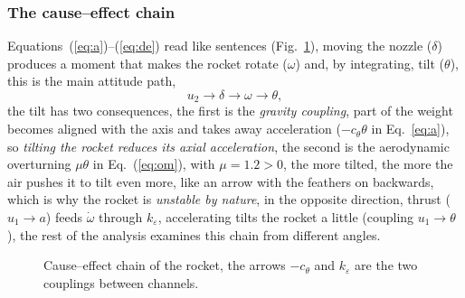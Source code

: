 \documentclass[article, 11pt]{IEEEtran}   %
\begin{document}
\subsubsection{The cause--effect chain}
Equations~(\ref{eq:a})--(\ref{eq:de}) read like sentences (Fig.~\ref{fig:cadena}), moving the nozzle ($\delta$) produces a moment that makes the rocket rotate ($\omega$) and, by integrating, tilt ($\theta$), this is the main attitude path,
\begin{equation}
u_2\to\delta\to\omega\to\theta,
\end{equation}
the tilt has two consequences, the first is the \emph{gravity coupling}, part of the weight becomes aligned with the axis and takes away acceleration ($-c_\theta\theta$ in Eq.~\ref{eq:a}), so \emph{tilting the rocket reduces its axial acceleration}, the second is the aerodynamic overturning $\mu\theta$ in Eq.~(\ref{eq:om}), with $\mu=1.2>0$, the more tilted, the more the air pushes it to tilt even more, like an arrow with the feathers on backwards, which is why the rocket is \emph{unstable by nature}, in the opposite direction, thrust ($u_1\to a$) feeds $\dot\omega$ through $k_\varepsilon$, accelerating tilts the rocket a little (coupling $u_1\to\theta$), the rest of the analysis examines this chain from different angles.

\begin{figure}[!t]
\centering
{}
\caption{Cause--effect chain of the rocket, the arrows $-c_\theta$ and $k_\varepsilon$ are the two couplings between channels.}\label{fig:cadena}
\end{figure}
\end{document}
